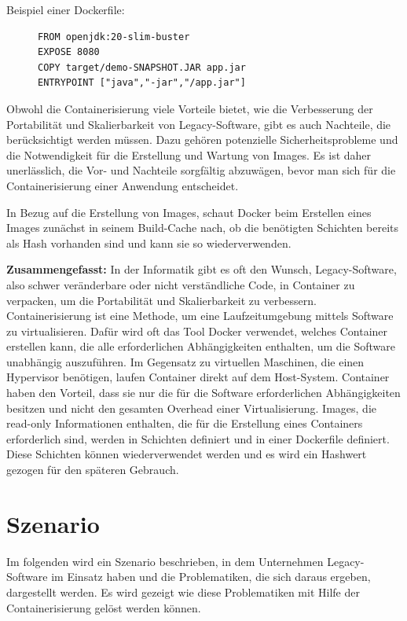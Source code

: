 \begin{description}
	\item[Beispiel einer Dockerfile:]\leavevmode
	\begin{lstlisting}
FROM openjdk:20-slim-buster
EXPOSE 8080
COPY target/demo-SNAPSHOT.JAR app.jar
ENTRYPOINT ["java","-jar","/app.jar"]
\end{lstlisting}
\end{description}


Obwohl die Containerisierung viele Vorteile bietet, wie die Verbesserung der Portabilität und Skalierbarkeit von Legacy-Software, gibt es auch Nachteile, die berücksichtigt werden müssen. Dazu gehören potenzielle Sicherheitsprobleme und die Notwendigkeit für die Erstellung und Wartung von Images. Es ist daher unerlässlich, die Vor- und Nachteile sorgfältig abzuwägen, bevor man sich für die Containerisierung einer Anwendung entscheidet.

In Bezug auf die Erstellung von Images, schaut Docker beim Erstellen eines Images zunächst in seinem Build-Cache nach, ob die benötigten Schichten bereits als Hash vorhanden sind und kann sie so wiederverwenden.


\textbf{Zusammengefasst:}
In der Informatik gibt es oft den Wunsch, Legacy-Software, also schwer veränderbare oder nicht verständliche Code, in Container zu verpacken, um die Portabilität und Skalierbarkeit zu verbessern.
Containerisierung ist eine Methode, um eine Laufzeitumgebung mittels Software zu virtualisieren. Dafür wird oft das Tool Docker verwendet, welches Container erstellen kann, die alle erforderlichen Abhängigkeiten enthalten, um die Software unabhängig auszuführen.
Im Gegensatz zu virtuellen Maschinen, die einen Hypervisor benötigen, laufen Container direkt auf dem Host-System. Container haben den Vorteil, dass sie nur die für die Software erforderlichen Abhängigkeiten besitzen und nicht den gesamten Overhead einer Virtualisierung. Images, die read-only Informationen enthalten, die für die Erstellung eines Containers erforderlich sind, werden in Schichten definiert und in einer Dockerfile definiert.
Diese Schichten können wiederverwendet werden und es wird ein Hashwert gezogen für den späteren Gebrauch.


\section{Szenario}
Im folgenden wird ein Szenario beschrieben, in dem Unternehmen Legacy-Software im Einsatz haben und die Problematiken, die sich daraus ergeben, dargestellt werden. Es wird gezeigt wie diese Problematiken mit Hilfe der Containerisierung gelöst werden können.

